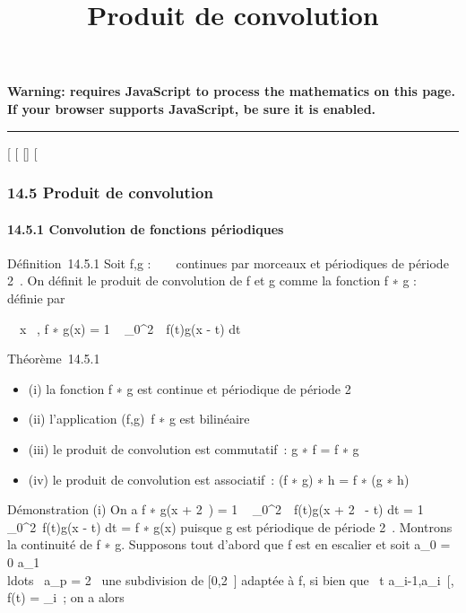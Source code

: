\documentclass[]{article}
\title{Produit de convolution}
\author{}
\date{}
\begin{document}
\maketitle

\textbf{Warning: 
requires JavaScript to process the mathematics on this page.\\ If your
browser supports JavaScript, be sure it is enabled.}

\begin{center}\rule{3in}{0.4pt}\end{center}

{[}
{[}
{[}{]}
{[}

\subsubsection{14.5 Produit de convolution}

\paragraph{14.5.1 Convolution de fonctions périodiques}

Définition~14.5.1 Soit f,g : ~ \rightarrow~  continues par morceaux et périodiques
de période 2\pi~. On définit le produit de convolution de f et g comme la
fonction f ∗ g : ~ \rightarrow~  définie par

\forall~~x \in {}~, f ∗ g(x) = 1 \pi~ \int  _0^2\pi~~f(t)g(x - t) dt

Théorème~14.5.1

\begin{itemize}
\itemsep1pt\parskip0pt
\item
  (i) la fonction f ∗ g est continue et périodique de période 2\pi~
\item
  (ii) l'application (f,g)\mapsto~f ∗ g est
  bilinéaire
\item
  (iii) le produit de convolution est commutatif~: g ∗ f = f ∗ g
\item
  (iv) le produit de convolution est associatif~: (f ∗ g) ∗ h = f ∗ (g ∗
  h)
\end{itemize}

Démonstration (i) On a f ∗ g(x + 2\pi~) = 1 \pi~
\int  _0^2\pi~~f(t)g(x + 2\pi~ - t) dt
= 1 \pi~ \int ~
_0^2\pi~f(t)g(x - t) dt = f ∗ g(x) puisque g est périodique
de période 2\pi~. Montrons la continuité de f ∗ g. Supposons tout d'abord
que f est en escalier et soit a_0 = 0 \leq a_1
\leq\\ldots~ \leq
a_p = 2\pi~ une subdivision de {[}0,2\pi~{]} adaptée à f, si bien que
\forall~t \in{]}a_i-1,a_i~{[}, f(t) =
\lambda_i~; on a alors
\end{document}
